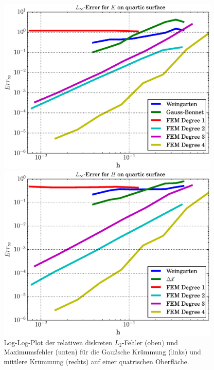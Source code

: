 \begin{figure}
\begin{minipage}[t]{0.49\textwidth}
       \centering\includegraphics[width=\textwidth]{bilder/Curvature/heineB/ErrKMax.eps}
    \end{minipage}\hfill
    \begin{minipage}[t]{0.49\textwidth}
       \centering\includegraphics[width=\textwidth]{bilder/Curvature/heineB/ErrHMax.eps}
    \end{minipage}
    \caption[Fehlerplot (Krümmungen auf quatrischer Oberfläche)]
            {Log-Log-Plot der relativen diskreten \( L_{2} \)-Fehler (oben) und Maximumsfehler (unten) 
             für die Gaußsche Krümmung (links) und mittlere Krümmung (rechts) auf einer quatrischen
             Oberfläche.}
    \label{figErrCompHeineB}
  \end{figure}

